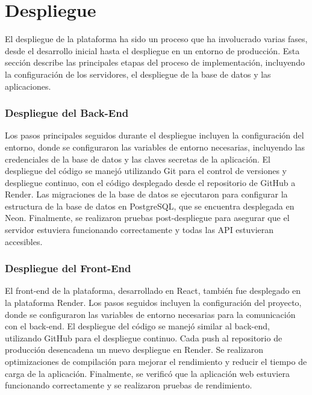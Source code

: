 \section{Despliegue}

El despliegue de la plataforma ha sido un proceso que ha involucrado varias fases, desde el desarrollo inicial hasta el despliegue en un entorno de producción. Esta sección describe las principales etapas del proceso de implementación, incluyendo la configuración de los servidores, el despliegue de la base de datos y las aplicaciones.

\subsubsection{Despliegue del Back-End}
Los pasos principales seguidos durante el despliegue incluyen la configuración del entorno, donde se configuraron las variables de entorno necesarias, incluyendo las credenciales de la base de datos y las claves secretas de la aplicación. El despliegue del código se manejó utilizando Git para el control de versiones y despliegue continuo, con el código desplegado desde el repositorio de GitHub a Render. Las migraciones de la base de datos se ejecutaron para configurar la estructura de la base de datos en PostgreSQL, que se encuentra desplegada en Neon. Finalmente, se realizaron pruebas post-despliegue para asegurar que el servidor estuviera funcionando correctamente y todas las API estuvieran accesibles.

\subsubsection{Despliegue del Front-End}
El front-end de la plataforma, desarrollado en React, también fue desplegado en la plataforma Render. Los pasos seguidos incluyen la configuración del proyecto, donde se configuraron las variables de entorno necesarias para la comunicación con el back-end. El despliegue del código se manejó similar al back-end, utilizando GitHub para el despliegue continuo. Cada push al repositorio de producción desencadena un nuevo despliegue en Render. Se realizaron optimizaciones de compilación para mejorar el rendimiento y reducir el tiempo de carga de la aplicación. Finalmente, se verificó que la aplicación web estuviera funcionando correctamente y se realizaron pruebas de rendimiento.
